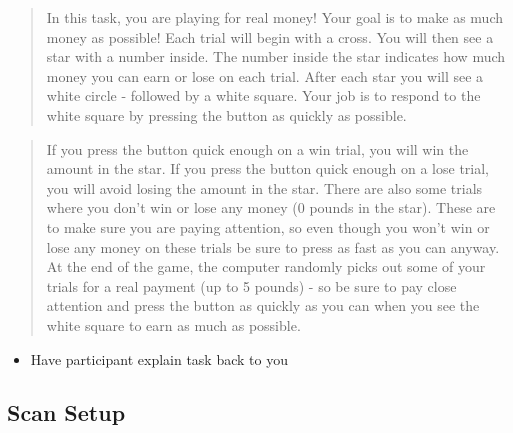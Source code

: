 \documentclass[
]{book}
\providecommand{\tightlist}{%
  \setlength{\itemsep}{0pt}\setlength{\parskip}{0pt}}
\begin{document}
\begin{quote}
In this task, you are playing for real money! Your goal is to make as much money as possible! Each trial will begin with a cross. You will then see a star with a number inside. The number inside the star indicates how much money you can earn or lose on each trial. After each star you will see a white circle - followed by a white square. Your job is to respond to the white square by pressing the button as quickly as possible.
\end{quote}

\begin{quote}
If you press the button quick enough on a win trial, you will win the amount in the star. If you press the button quick enough on a lose trial, you will avoid losing the amount in the star. There are also some trials where you don't win or lose any money (0 pounds in the star). These are to make sure you are paying attention, so even though you won't win or lose any money on these trials be sure to press as fast as you can anyway. At the end of the game, the computer randomly picks out some of your trials for a real payment (up to 5 pounds) - so be sure to pay close attention and press the button as quickly as you can when you see the white square to earn as much as possible.
\end{quote}

\begin{itemize}
\tightlist
\item
  Have participant explain task back to you
\end{itemize}

\hypertarget{scan-setup}{%
\subsection{Scan Setup}\label{scan-setup}}
\end{document}
